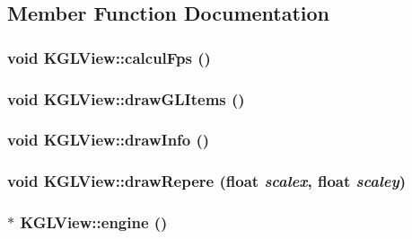 \subsection{Member Function Documentation}
\hypertarget{class_k_g_l_view_ca124634504e74e91e9d0a00c485c388}{
\subsubsection[{calculFps}]{\setlength{\rightskip}{0pt plus 5cm}void KGLView::calculFps ()}}
\label{class_k_g_l_view_ca124634504e74e91e9d0a00c485c388}


\hypertarget{class_k_g_l_view_f51f913a1902dbc506e4a070cb3e3058}{
\subsubsection[{drawGLItems}]{\setlength{\rightskip}{0pt plus 5cm}void KGLView::drawGLItems ()}}
\label{class_k_g_l_view_f51f913a1902dbc506e4a070cb3e3058}


\hypertarget{class_k_g_l_view_ed5b1c5deb70a6fe75698d6bf13de0d5}{
\subsubsection[{drawInfo}]{\setlength{\rightskip}{0pt plus 5cm}void KGLView::drawInfo ()}}
\label{class_k_g_l_view_ed5b1c5deb70a6fe75698d6bf13de0d5}


\hypertarget{class_k_g_l_view_90318195b5d7d7b03b8d0f21e1993495}{
\subsubsection[{drawRepere}]{\setlength{\rightskip}{0pt plus 5cm}void KGLView::drawRepere (float {\em scalex}, \/  float {\em scaley})}}
\label{class_k_g_l_view_90318195b5d7d7b03b8d0f21e1993495}


\hypertarget{class_k_g_l_view_e426a41ab8a5565bf7bfd861f05cfb46}{
\subsubsection[{engine}]{$\ast$ KGLView::engine ()}}
\label{class_k_g_l_view_e426a41ab8a5565bf7bfd861f05cfb46}



